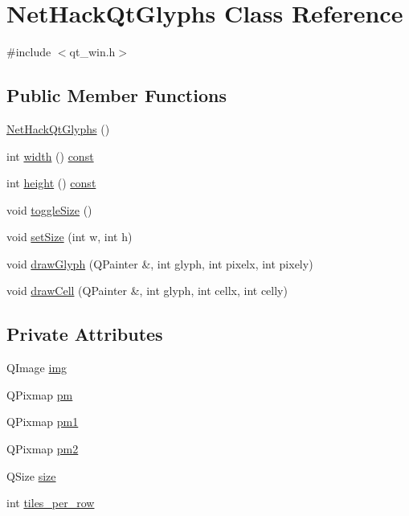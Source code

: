 \hypertarget{classNetHackQtGlyphs}{\section{Net\+Hack\+Qt\+Glyphs Class Reference}
\label{classNetHackQtGlyphs}
}


{\ttfamily \#include $<$qt\+\_\+win.\+h$>$}

\subsection*{Public Member Functions}
\begin{DoxyCompactItemize}
\item 
\hyperlink{classNetHackQtGlyphs_a97e43a110449404c8afa3a3c4fac2f2b}{Net\+Hack\+Qt\+Glyphs} ()
\item 
int \hyperlink{classNetHackQtGlyphs_a6b502ae3e9b591e19c8cad34f4ae868c}{width} () \hyperlink{tradstdc_8h_a2c212835823e3c54a8ab6d95c652660e}{const} 
\item 
int \hyperlink{classNetHackQtGlyphs_af74e8925416537cdfd1f5c787f51c6e3}{height} () \hyperlink{tradstdc_8h_a2c212835823e3c54a8ab6d95c652660e}{const} 
\item 
void \hyperlink{classNetHackQtGlyphs_a2c5265528580b063ea49c1125d9192a7}{toggle\+Size} ()
\item 
void \hyperlink{classNetHackQtGlyphs_a4a2ec980045342efec77daf691640a85}{set\+Size} (int w, int h)
\item 
void \hyperlink{classNetHackQtGlyphs_a5b0b380a0f59893908db1bba7010ac5d}{draw\+Glyph} (Q\+Painter \&, int glyph, int pixelx, int pixely)
\item 
void \hyperlink{classNetHackQtGlyphs_a265958ff70784d1a1b7126235c54b5c6}{draw\+Cell} (Q\+Painter \&, int glyph, int cellx, int celly)
\end{DoxyCompactItemize}
\subsection*{Private Attributes}
\begin{DoxyCompactItemize}
\item 
Q\+Image \hyperlink{classNetHackQtGlyphs_a9edcebfbacfad5f904b4090e3e17e6ca}{img}
\item 
Q\+Pixmap \hyperlink{classNetHackQtGlyphs_a69278ce42d9f4357ab883f159646839d}{pm}
\item 
Q\+Pixmap \hyperlink{classNetHackQtGlyphs_a42bbc132c3aaac2ba555a3fc7ae9c60a}{pm1}
\item 
Q\+Pixmap \hyperlink{classNetHackQtGlyphs_a5f7ec5a187648043433f326065c710ca}{pm2}
\item 
Q\+Size \hyperlink{classNetHackQtGlyphs_a8128893ac46751b7a00c4635b585d677}{size}
\item 
int \hyperlink{classNetHackQtGlyphs_a32a0428bbf038bae5135d20e0fbca31d}{tiles\+\_\+per\+\_\+row}
\end{DoxyCompactItemize}


